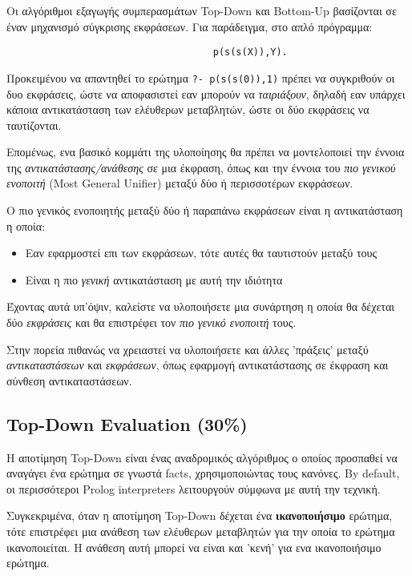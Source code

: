 \documentclass[10pt]{article}
\begin{document}
Οι αλγόριθμοι εξαγωγής συμπερασμάτων Top-Down και Bottom-Up βασίζονται σε έναν μηχανισμό σύγκρισης εκφράσεων. Για παράδειγμα, στο απλό πρόγραμμα:

\begin{verbatim}
                                    p(s(s(X)),Y).
\end{verbatim}

Προκειμένου να απαντηθεί το ερώτημα \verb|?- p(s(s(0)),1)| πρέπει να συγκριθούν οι δυο εκφράσεις, ώστε να αποφασιστεί εαν μπορούν να \textit{ταιριάξουν}, δηλαδή εαν υπάρχει κάποια αντικατάσταση των ελέυθερων μεταβλητών, ώστε οι δύο εκφράσεις να ταυτίζονται. \

Επομένως, ενα βασικό κομμάτι της υλοποίησης θα πρέπει να μοντελοποιεί την έννοια της \textit{αντικατάστασης/ανάθεσης} σε μια έκφραση, όπως και την έννοια του \textit{πιο γενικού ενοποιτή} (Most General Unifier) μεταξύ δύο ή περισσοτέρων εκφράσεων.

Ο πιο γενικός ενοποιητής μεταξύ δύο ή παραπάνω εκφράσεων είναι η αντικατάσταση η οποία:
\begin{itemize}
    \item Εαν εφαρμοστεί επι των εκφράσεων, τότε αυτές θα ταυτιστούν μεταξύ τους 
    \item Είναι η πιο \textit{γενική} αντικατάσταση με αυτή την ιδιότητα
\end{itemize}

Έχοντας αυτά υπ'όψιν, καλείστε να υλοποιήσετε μια συνάρτηση η οποία θα δέχεται δύο \textit{εκφράσεις} και  θα επιστρέφει τον \textit{πιο γενικό ενοποιτή} τους.\

Στην πορεία πιθανώς να χρειαστεί να υλοποιήσετε και άλλες 'πράξεις' μεταξύ \textit{αντικαταστάσεων} και \textit{εκφράσεων}, όπως εφαρμογή αντικατάστασης σε έκφραση και σύνθεση αντικαταστάσεων.


\subsection*{Top-Down Evaluation (30\%)}

Η αποτίμηση Top-Down είναι ένας αναδρομικός αλγόριθμος ο οποίος προσπαθεί να αναγάγει ένα ερώτημα σε γνωστά facts, χρησιμοποιώντας τους κανόνες. By default, οι περισσότεροι Prolog interpreters λειτουργούν σύμφωνα με αυτή την τεχνική.\

Συγκεκριμένα, όταν η αποτίμηση Top-Down δέχεται ένα \textbf{ικανοποιήσιμο} ερώτημα, τότε επιστρέφει μια ανάθεση των ελέυθερων μεταβλητών για την οποία το ερώτημα ικανοποιείται. H ανάθεση αυτή μπορεί να είναι και 'κενή' για ενα ικανοποιήσιμο ερώτημα.\
\end{document}
